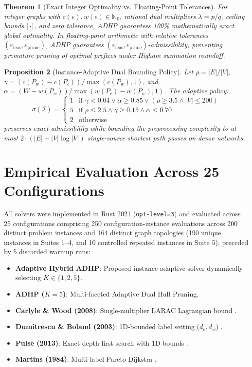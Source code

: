 \documentclass[11pt,a4paper]{article}
\newtheorem{theorem}{Theorem}
\newtheorem{proposition}[theorem]{Proposition}
\begin{document}
\begin{theorem}[Exact Integer Optimality vs. Floating-Point Tolerances]
For integer graphs with $c(e), w(e) \in \mathbb{N}_0$, rational dual multipliers $\lambda = p/q$, ceiling bounds $\lceil \cdot \rceil$, and zero tolerance, ADHP guarantees 100\% mathematically exact global optimality. In floating-point arithmetic with relative tolerances $(\varepsilon_{\text{feas}}, \varepsilon_{\text{prune}})$, ADHP guarantees $(\varepsilon_{\text{feas}}, \varepsilon_{\text{prune}})$-admissibility, preventing premature pruning of optimal prefixes under Higham summation roundoff.
\end{theorem}

\begin{proposition}[Instance-Adaptive Dual Bounding Policy]
Let $\rho = |E| / |V|$, $\gamma = (c(P_w) - c(P_c)) / \max(c(P_w), 1)$, and $\alpha = (W - w(P_w)) / \max(w(P_c) - w(P_w), 1)$. The adaptive policy:
$$\sigma(\mathcal{I}) = \begin{cases} 1 & \text{if } \gamma < 0.04 \lor \alpha \ge 0.85 \lor (\rho \ge 3.5 \land |V| \le 200) \\ 5 & \text{if } \rho \le 2.5 \land \gamma \ge 0.15 \land \alpha \le 0.70 \\ 2 & \text{otherwise} \end{cases}$$
preserves exact admissibility while bounding the preprocessing complexity to at most $2 \cdot (|E| + |V| \log |V|)$ single-source shortest path passes on dense networks.
\end{proposition}

\section{Empirical Evaluation Across 25 Configurations}
All solvers were implemented in Rust 2021 (\texttt{opt-level=3}) and evaluated across 25 configurations comprising 250 configuration-instance evaluations across 200 distinct problem instances and 164 distinct graph topologies (190 unique instances in Suites 1--4, and 10 controlled repeated instances in Suite 5), preceded by 5 discarded warmup runs:
\begin{itemize}
    \item \textbf{Adaptive Hybrid ADHP}: Proposed instance-adaptive solver dynamically selecting $K \in \{1, 2, 5\}$.
    \item \textbf{ADHP ($K=5$)}: Multi-faceted Adaptive Dual Hull Pruning.
    \item \textbf{Carlyle \& Wood (2008)}: Single-multiplier LARAC Lagrangian bound \cite{carlyle2008lagrangian}.
    \item \textbf{Dumitrescu \& Boland (2003)}: 1D-bounded label setting ($d_c, d_w$) \cite{dumitrescu2003improved}.
    \item \textbf{Pulse (2013)}: Exact depth-first search with 1D bounds \cite{lozano2013exact}.
    \item \textbf{Martins (1984)}: Multi-label Pareto Dijkstra \cite{martins1984multicriteria}.
\end{itemize}
\end{document}
